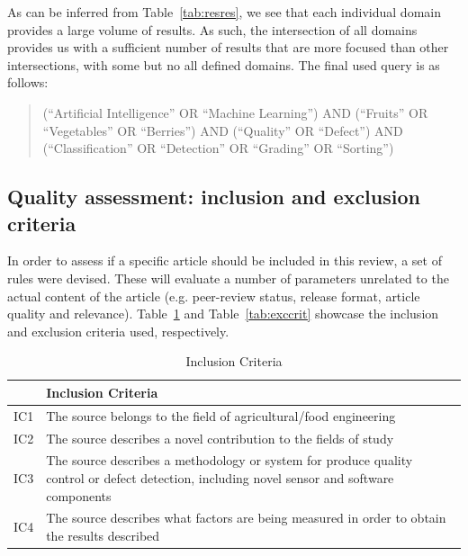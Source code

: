 \documentclass[conference]{IEEEtran}
\begin{document}
As can be inferred from Table~\ref{tab:resres}, we see that each individual domain provides a large volume of results. As such, the intersection of all domains provides us with a sufficient number of results that are more focused than other intersections, with some but no all defined domains. The final used query is as follows:

\begin{quote}
 (``Artificial Intelligence'' OR ``Machine Learning'') AND (``Fruits'' OR ``Vegetables'' OR ``Berries'') AND (``Quality'' OR ``Defect'') AND (``Classification'' OR ``Detection'' OR ``Grading'' OR ``Sorting'')
\end{quote}

\subsection{Quality assessment: inclusion and exclusion criteria}

In order to assess if a specific article should be included in this review, a set of rules were devised. These will evaluate a number of parameters unrelated to the actual content of the article (e.g. peer-review status, release format, article quality and relevance). Table~\ref{tab:inccrit} and Table~\ref{tab:exccrit} showcase the inclusion and exclusion criteria used, respectively.

\begin{table}
	\caption{Inclusion Criteria}
	\label{tab:inccrit}

	\begin{tabular}{ll}
	\hline
		 & Inclusion Criteria \\
	\hline
		IC1 & The source belongs to the field of agricultural/food engineering  \\
		IC2 & The source describes a novel contribution to the fields of study \\
		IC3 & The source describes a methodology or system for produce quality control or defect detection, including novel sensor and software components \\
		IC4 & The source describes what factors are being measured in order to obtain the results described \\
	\hline
	\end{tabular}
\end{table}
\end{document}
